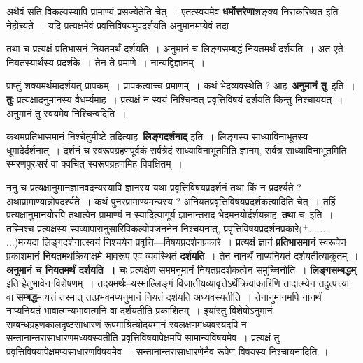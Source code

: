 \documentclass[article,12pt,a4paper]{memoir}
\newcommand{\add}[1]{($^{+}$#1)}
\begin{document}
	  \pstart अथैवं सति विकल्पस्यापि प्रामाण्यं प्रसज्येतेति चेत् । एतत्स्वयमेव \textbf{धर्मोत्तरेणा}शङ्क्य निराकरिष्यत इति नेहोच्यते । यदि प्रत्यक्षमेवं प्रवृत्तिविषयमुपदर्शयति अनुमानमप्येवं तदा    \leavevmode{} 
	  
	तथा च प्रत्यक्षं प्रतिभासनं नियतमर्थं दर्शयति । अनुमानं च लिङ्गसम्बद्धं नियतमर्थं दर्शयति । अत एते नियतस्यार्थस्य प्रदर्शके । तेन ते प्रमाणे । नान्यद्विज्ञानम् ।  
	  
	प्राप्तुं शक्यमर्थमादर्शयत् प्रापकम् । प्रापकत्वाच्च प्रमाणम् । कथं भेदव्यवस्थेति ? आह--\textbf{अनुमानं तु}--इति । \textbf{तुः} प्रत्यक्षादनुमानस्य वैधर्म्यमाह । प्रत्यक्षं न स्वयं निश्चिन्वत् प्रवृत्तिविषयं दर्शयति किन्तु निश्चाययत् । अनुमानं तु स्वयमेव निश्चिन्वदिति ।
	\pend
      

	  \pstart कथमप्रतिभासमानं निश्चेतुमीष्टे तदित्याह--\textbf{लिङ्गदर्शनाद्} इति । लिङ्गस्य साध्याविनाभूतस्य धूमादेर्दर्शनात् । दर्शनं च स्वरूपग्रहणपूर्वकं सर्वत्रेदं साध्याविनाभूतमिति ज्ञानम्, सर्वत्र साध्याविनाभूतमिति स्मरणपुरःसरं वा क्वचित् स्वरूपग्रहणमिह विवक्षितम् ।
	\pend
      

	  \pstart ननु च प्रत्यक्षानुमानज्ञानवदन्यस्यापि ज्ञानस्य यथा प्रवृत्तिविषयप्रदर्शनं तथा किं न प्रदर्श्यते ? अथाप्रामाण्यान्नोपदर्श्यते । कथं पुनरप्रामाण्यमन्यस्य ? अनियतप्रवृत्तिविषयप्रदर्शकत्वादिति चेत् । तर्हि प्रत्यक्षानुमानयोरपि तथात्वेन प्रामाण्यं न स्यादित्यागूर्य ज्ञानान्तराद भेदमनयोर्दर्शयन्नाह--\textbf{तथा} च--इति । तस्मिश्च प्रत्यक्षस्य स्वव्यापारानुसारिविकल्पोपजननेन निश्चयनात्, प्रवृत्तिविषयप्रदर्शनप्रकारे\add{... ... ...}मन्यदा लिङ्गदर्शनात्स्वयं निश्चयेन प्रवृत्ति—विषयप्रदर्शनप्रकारे । \textbf{प्रत्यक्षं} ज्ञानं \textbf{प्रतिभासमानं} स्वरूपेण प्रकाशमानं \textbf{निय}त\textbf{म}र्थक्रियाक्षमे भावरूप एव व्यवस्थितं \textbf{दर्शयति} । तेन नानर्थं नाप्यनियतं दर्शयतीत्याकूतम् । \textbf{अनुमानं च नियतमर्थं दर्शयति । चः} प्रत्यक्षेण सममनुमानं नियतप्रदर्शकत्वेन समुच्चिनोति । \textbf{लिङ्गसम्बद्धम्} इति हेतुभावेन विशेषणम् । तदयमर्थः--यस्माल्लिङ्गं विजातीयव्यावृत्तेऽर्थेक्रियाकारिणि तादात्म्येन तदुत्पत्त्या वा \textbf{सम्बद्ध}मायत्तं तस्मात् तत्प्रभवमप्यनुमानं नियतं दर्शयति अध्यवस्यतीति । तेनानुमानमपि नानर्थं नाप्यनियतं भावात्मन्यभावात्मनि वा दर्शयतीति प्रकाशितम् । इयांस्तु विशेषोऽनुमानं सम्बन्धग्रहणकालदृष्टसाधारणं रूपमाश्रित्योदयमानं स्वलक्षणमध्यवस्यदपि न सन्तानान्तरासाधारणमध्यवस्यतीति प्रवृत्तिविषयापेक्षमपि सामान्यविषयमेव । प्रत्यक्षं तु प्रवृत्तिविषयापेक्षमप्यसाधारणविषयमेव । सन्तानान्तरासाधा\leavevmode{}रणेनैव रूपेण विषयस्य निश्चायनादिति ।
	\pend
      
\end{document}
